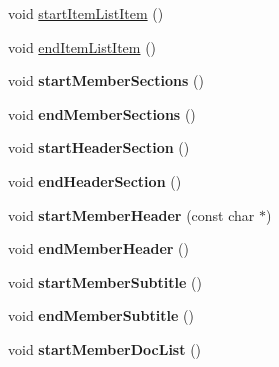 \begin{DoxyCompactItemize}
\item 
void \hyperlink{class_r_t_f_generator_ab4ab0e8996b14723e45e955fe68f03bc}{start\-Item\-List\-Item} ()
\item 
void \hyperlink{class_r_t_f_generator_a61efca8a19608566df04a45d16e88449}{end\-Item\-List\-Item} ()
\item 
\hypertarget{class_r_t_f_generator_aa363f7f143f8451b0fd035e9856f1b87}{void {\bfseries start\-Member\-Sections} ()}\label{class_r_t_f_generator_aa363f7f143f8451b0fd035e9856f1b87}

\item 
\hypertarget{class_r_t_f_generator_a2f9645e00372366ad64476dbc66cd5ac}{void {\bfseries end\-Member\-Sections} ()}\label{class_r_t_f_generator_a2f9645e00372366ad64476dbc66cd5ac}

\item 
\hypertarget{class_r_t_f_generator_add9e7a492a43830dd3c77cd0e5c06884}{void {\bfseries start\-Header\-Section} ()}\label{class_r_t_f_generator_add9e7a492a43830dd3c77cd0e5c06884}

\item 
\hypertarget{class_r_t_f_generator_aeca202ed7306f7d9aa20f8e707d96301}{void {\bfseries end\-Header\-Section} ()}\label{class_r_t_f_generator_aeca202ed7306f7d9aa20f8e707d96301}

\item 
\hypertarget{class_r_t_f_generator_ae6947537ee279d8d1fe810bc69b3fc7f}{void {\bfseries start\-Member\-Header} (const char $\ast$)}\label{class_r_t_f_generator_ae6947537ee279d8d1fe810bc69b3fc7f}

\item 
\hypertarget{class_r_t_f_generator_a618c1bfc8806d29116abac6b5817c137}{void {\bfseries end\-Member\-Header} ()}\label{class_r_t_f_generator_a618c1bfc8806d29116abac6b5817c137}

\item 
\hypertarget{class_r_t_f_generator_a7cf4dbf258928f842c9e96807345bc7a}{void {\bfseries start\-Member\-Subtitle} ()}\label{class_r_t_f_generator_a7cf4dbf258928f842c9e96807345bc7a}

\item 
\hypertarget{class_r_t_f_generator_a8073c2e7983bc4cd328e4229f51f3bbf}{void {\bfseries end\-Member\-Subtitle} ()}\label{class_r_t_f_generator_a8073c2e7983bc4cd328e4229f51f3bbf}

\item 
\hypertarget{class_r_t_f_generator_a45f1ccc157c1f0a3797f633881b4945e}{void {\bfseries start\-Member\-Doc\-List} ()}\label{class_r_t_f_generator_a45f1ccc157c1f0a3797f633881b4945e}


\end{DoxyCompactItemize}
